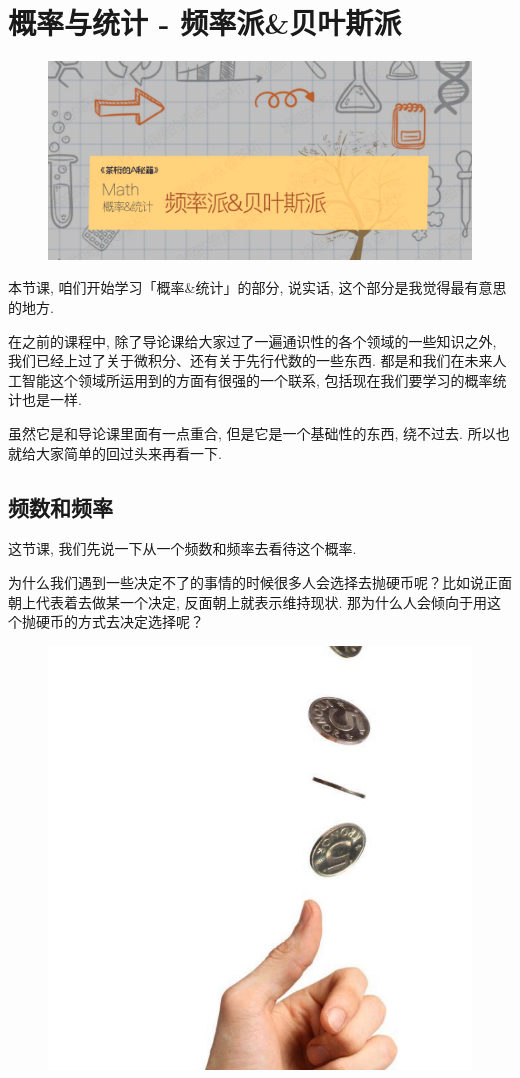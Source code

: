 \chapter{概率与统计 - 频率派\&贝叶斯派}
\begin{figure}[ht]
  \centering
  \includegraphics[width=1\linewidth]{asset/茶桁的AI秘籍_Math_19.png}
\end{figure}

\newpage

本节课, 咱们开始学习「概率\&统计」的部分, 说实话, 这个部分是我觉得最有意思的地方. 

在之前的课程中, 除了导论课给大家过了一遍通识性的各个领域的一些知识之外, 我们已经上过了关于微积分、还有关于先行代数的一些东西. 都是和我们在未来人工智能这个领域所运用到的方面有很强的一个联系, 包括现在我们要学习的概率统计也是一样. 

虽然它是和导论课里面有一点重合, 但是它是一个基础性的东西, 绕不过去. 所以也就给大家简单的回过头来再看一下. 

\section{频数和频率}

这节课, 我们先说一下从一个频数和频率去看待这个概率. 

为什么我们遇到一些决定不了的事情的时候很多人会选择去抛硬币呢？比如说正面朝上代表着去做某一个决定, 反面朝上就表示维持现状. 那为什么人会倾向于用这个抛硬币的方式去决定选择呢？

\begin{figure}[ht]
  \centering
  \includegraphics[width=0.5\linewidth]{asset/20230915222104.png}
  \caption{}
  \label{fig:img20_1}
\end{figure}

